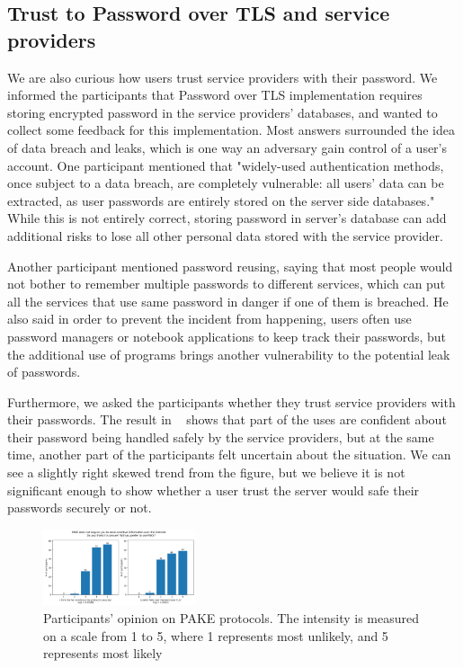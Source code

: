\subsection{Trust to Password over TLS and service providers}
\label{sec:trust}
We are also curious how users trust service providers with their password.
We informed the participants that Password over TLS implementation requires storing encrypted password in the service providers' databases, and wanted to collect some feedback for this implementation.
Most answers surrounded the idea of data breach and leaks, which is one way an adversary gain control of a user's account.
One participant mentioned that "widely-used authentication methods, once subject to a data breach, are completely vulnerable: all users' data can be extracted, as user passwords are entirely stored on the server side databases."
While this is not entirely correct, storing password in server's database can add additional risks to lose all other personal data stored with the service provider.

Another participant mentioned password reusing, saying that most people would not bother to remember multiple passwords to different services, which can put all the services that use same password in danger if one of them is breached.
He also said in order to prevent the incident from happening, users often use password managers or notebook applications to keep track their passwords, but the additional use of programs brings another vulnerability to the potential leak of passwords.

Furthermore, we asked the participants whether they trust service providers with their passwords.
The result in ~ shows that part of the uses are confident about their password being handled safely by the service providers, but at the same time, another part of the participants felt uncertain about the situation.
We can see a slightly right skewed trend from the figure, but we believe it is not significant enough to show whether a user trust the server would safe their passwords securely or not.



\begin{figure}[ht]
  \centering
  \includegraphics[width=0.4\textwidth]{./images/secure_preference.png}
  \caption{Participants' opinion on PAKE protocols. 
  The intensity is measured on a scale from 1 to 5, where 1 represents most unlikely, and 5 represents most likely}
  \label{fig:preference}
\end{figure}

